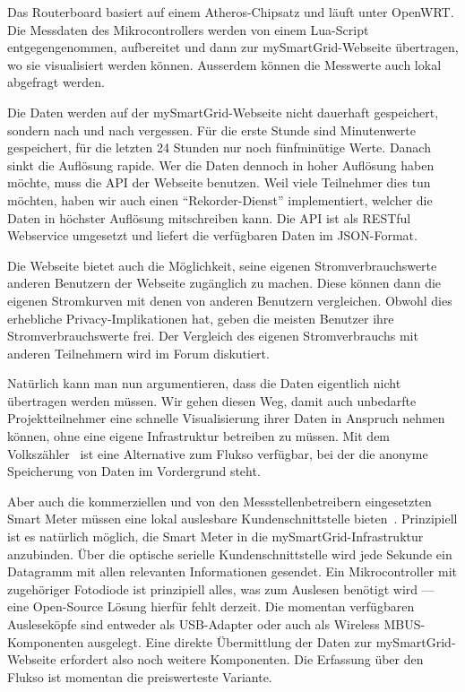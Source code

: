 \documentclass[12pt,BCOR=8.5mm]{scrartcl}
\begin{document}
Das Routerboard basiert auf einem Atheros-Chipsatz und läuft unter
OpenWRT. Die Messdaten des Mikrocontrollers werden von einem Lua-Script
entgegengenommen, aufbereitet und dann zur mySmartGrid-Webseite
übertragen, wo sie visualisiert werden können. Ausserdem können die
Messwerte auch lokal abgefragt werden.

Die Daten werden auf der mySmartGrid-Webseite nicht dauerhaft
gespeichert, sondern nach und nach vergessen. Für die erste Stunde sind
Minutenwerte gespeichert, für die letzten 24 Stunden nur noch
fünfminütige Werte. Danach sinkt die Auflösung rapide. Wer die Daten
dennoch in hoher Auflösung haben möchte, muss die API der Webseite
benutzen. Weil viele Teilnehmer dies tun möchten, haben wir auch einen
"`Rekorder-Dienst"' implementiert, welcher die Daten in höchster
Auflösung mitschreiben kann. Die API ist als RESTful Webservice
umgesetzt und liefert die verfügbaren Daten im JSON-Format.

Die Webseite bietet auch die Möglichkeit, seine eigenen
Stromverbrauchswerte anderen Benutzern der Webseite zugänglich zu
machen. Diese können dann die eigenen Stromkurven mit denen von
anderen Benutzern vergleichen. Obwohl dies erhebliche
Privacy-Implikationen hat, geben die meisten Benutzer ihre
Stromverbrauchswerte frei. Der Vergleich des eigenen Stromverbrauchs mit
anderen Teilnehmern wird im Forum diskutiert.

Natürlich kann man nun argumentieren, dass die Daten eigentlich nicht
übertragen werden müssen. Wir gehen diesen Weg, damit auch unbedarfte
Projektteilnehmer eine schnelle Visualisierung ihrer Daten in Anspruch
nehmen können, ohne eine eigene Infrastruktur betreiben zu müssen. Mit
dem Volkszähler~\cite{web:volkszaehler} ist eine Alternative zum Flukso
verfügbar, bei der die anonyme Speicherung von Daten im Vordergrund
steht.

Aber auch die kommerziellen und von den Messstellenbetreibern
eingesetzten Smart Meter müssen eine lokal auslesbare
Kundenschnittstelle bieten~\cite{bundesnetzagentur10position}. 
Prinzipiell ist es natürlich möglich, die Smart
Meter in die mySmartGrid-Infrastruktur anzubinden. Über die optische
serielle Kundenschnittstelle wird jede Sekunde ein Datagramm mit allen
relevanten Informationen gesendet. Ein Mikrocontroller mit zugehöriger
Fotodiode ist prinzipiell alles, was zum Auslesen benötigt wird --- eine
Open-Source Lösung hierfür fehlt derzeit.
Die momentan verfügbaren Ausleseköpfe sind entweder als
USB-Adapter oder auch als Wireless MBUS-Komponenten ausgelegt. Eine
direkte Übermittlung der Daten zur mySmartGrid-Webseite erfordert also
noch weitere Komponenten. Die Erfassung über den Flukso ist momentan die
preiswerteste Variante.
\end{document}
